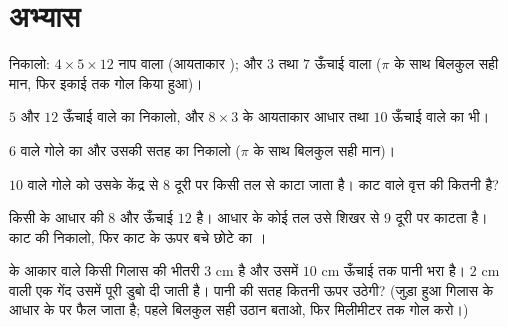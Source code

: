 \section{अभ्यास}

\begin{exercise}[$\star$]\label{exo:g9:solids:1}
 निकालो: $4 \times 5 \times 12$ नाप वाला  (आयताकार
); और $3$  तथा $7$ ऊँचाई वाला  ($\pi$ के साथ
बिलकुल सही मान, फिर इकाई तक गोल किया हुआ)।
\end{exercise}

\begin{exercise}[$\star$]\label{exo:g9:solids:2}
$5$  और $12$ ऊँचाई वाले  का  निकालो, और $8 \times 3$
के आयताकार आधार तथा $10$ ऊँचाई वाले  का भी।
\end{exercise}

\begin{exercise}[$\star$]\label{exo:g9:solids:3}
$6$  वाले गोले का  और उसकी सतह का  निकालो
($\pi$ के साथ बिलकुल सही मान)।
\end{exercise}

\begin{exercise}[$\star$]\label{exo:g9:solids:4}
$10$  वाले गोले को उसके केंद्र से $8$ दूरी पर किसी तल से काटा
जाता है। काट वाले वृत्त की  कितनी है?
\end{exercise}

\begin{exercise}[$\star\star$]\label{exo:g9:solids:5}
किसी  के आधार की  $8$ और ऊँचाई $12$ है। आधार के 
कोई तल उसे शिखर से $9$ दूरी पर काटता है। काट की  निकालो, फिर
काट के ऊपर बचे छोटे  का ।
\end{exercise}

\begin{exercise}[$\star\star$]\label{exo:g9:solids:6}
 के आकार वाले किसी गिलास की भीतरी  $3$ cm है और उसमें
$10$ cm ऊँचाई तक पानी भरा है। $2$ cm  वाली एक गेंद उसमें पूरी
डुबो दी जाती है। पानी की सतह कितनी ऊपर उठेगी? (जुड़ा हुआ  गिलास
के आधार के  पर फैल जाता है; पहले बिलकुल सही उठान बताओ, फिर
मिलीमीटर तक गोल करो।)
\end{exercise}

